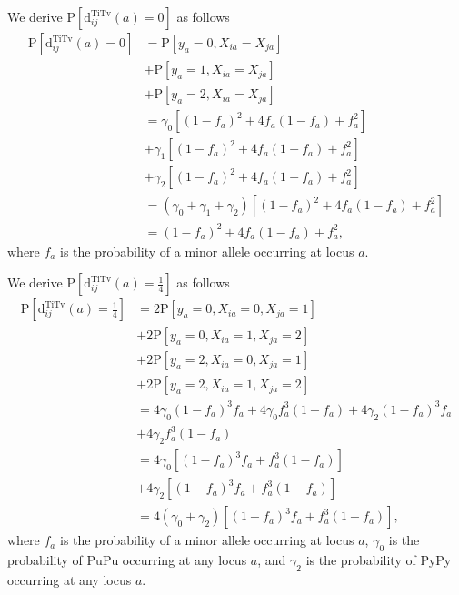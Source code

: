 \documentclass[10pt,letterpaper]{article}
\begin{document}
We derive $\text{P}\left[\text{d}^\text{TiTv}_{ij}(a) = 0\right]$ as follows
%
\begin{equation}\label{eq:prob_TiTv_0}
\begin{aligned}
\text{P}\left[\text{d}^\text{TiTv}_{ij}(a) = 0\right] &= \text{P}\left[y_a = 0, X_{ia} = X_{ja}\right] \\
&+ \text{P}\left[y_a = 1, X_{ia} = X_{ja}\right] \\
&+ \text{P}\left[y_a = 2, X_{ia} = X_{ja}\right] \\
&= \gamma_0 \left[(1 - f_a)^2 + 4 f_a (1 - f_a) + f^2_a\right] \\
&+ \gamma_1 \left[(1 - f_a)^2 + 4 f_a (1 - f_a) + f^2_a\right] \\
&+ \gamma_2 \left[(1 - f_a)^2 + 4 f_a (1 - f_a) + f^2_a\right] \\
&= (\gamma_0 + \gamma_1 + \gamma_2)\left[(1 - f_a)^2 + 4 f_a (1 - f_a) + f^2_a\right] \\
&= (1 - f_a)^2 + 4 f_a (1 - f_a) + f^2_a,
\end{aligned}
\end{equation}
%
where $f_a$ is the probability of a minor allele occurring at locus $a$.

We derive $\text{P}\left[\text{d}^\text{TiTv}_{ij}(a) = \frac{1}{4}\right]$ as follows
%
\begin{equation}\label{eq:prob_TiTv_0.25}
\begin{aligned}
\text{P}\left[\text{d}^\text{TiTv}_{ij}(a) = \frac{1}{4}\right] &= 2 \text{P}\left[y_a = 0, X_{ia} = 0, X_{ja} = 1\right] \\
&+ 2 \text{P}\left[y_a = 0, X_{ia} = 1, X_{ja} = 2\right] \\
&+ 2 \text{P}\left[y_a = 2, X_{ia} = 0, X_{ja} = 1\right] \\
&+ 2 \text{P}\left[y_a = 2, X_{ia} = 1, X_{ja} = 2\right] \\
&= 4 \gamma_0 (1 - f_a)^3 f_a + 4 \gamma_0 f^3_a (1 - f_a) + 4 \gamma_2 (1 - f_a)^3 f_a \\
&+ 4 \gamma_2 f^3_a (1 - f_a) \\
&= 4 \gamma_0 \left[(1 - f_a)^3 f_a + f^3_a (1 - f_a)\right] \\
&+ 4 \gamma_2 \left[(1 - f_a)^3 f_a + f^3_a (1 - f_a)\right] \\
&= 4(\gamma_0 + \gamma_2)\left[(1 - f_a)^3 f_a + f^3_a (1 - f_a)\right],
\end{aligned}
\end{equation}
%
where $f_a$ is the probability of a minor allele occurring at locus $a$, $\gamma_0$ is the probability of PuPu occurring at any locus $a$,  and $\gamma_2$ is the probability of PyPy occurring at any locus $a$.
\end{document}
